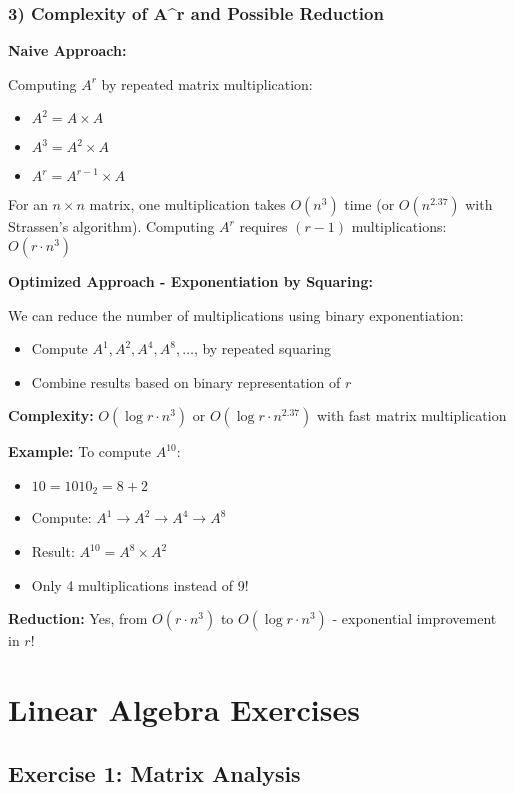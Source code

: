\documentclass[12pt,a4paper]{article}
\begin{document}
\subsubsection{3) Complexity of A^r and Possible Reduction}

\textbf{Naive Approach:}

Computing $A^r$ by repeated matrix multiplication:
\begin{itemize}
    \item $A^2 = A \times A$
    \item $A^3 = A^2 \times A$
    \item $A^r = A^{r-1} \times A$
\end{itemize}

For an $n \times n$ matrix, one multiplication takes $O(n^3)$ time (or $O(n^{2.37})$ with Strassen's algorithm).
Computing $A^r$ requires $(r-1)$ multiplications: \textbf{$O(r \cdot n^3)$}

\textbf{Optimized Approach - Exponentiation by Squaring:}

We can reduce the number of multiplications using binary exponentiation:
\begin{itemize}
    \item Compute $A^1, A^2, A^4, A^8, \ldots$, by repeated squaring
    \item Combine results based on binary representation of $r$
\end{itemize}

\textbf{Complexity:} $O(\log r \cdot n^3)$ or $O(\log r \cdot n^{2.37})$ with fast matrix multiplication

\textbf{Example:} To compute $A^{10}$:
\begin{itemize}
    \item $10 = 1010_2 = 8 + 2$
    \item Compute: $A^1 \rightarrow A^2 \rightarrow A^4 \rightarrow A^8$
    \item Result: $A^{10} = A^8 \times A^2$
    \item Only 4 multiplications instead of 9!
\end{itemize}

\textbf{Reduction:} Yes, from $O(r \cdot n^3)$ to \textbf{$O(\log r \cdot n^3)$} - exponential improvement in $r$!

\section{Linear Algebra Exercises}

\subsection{Exercise 1: Matrix Analysis}
\end{document}
